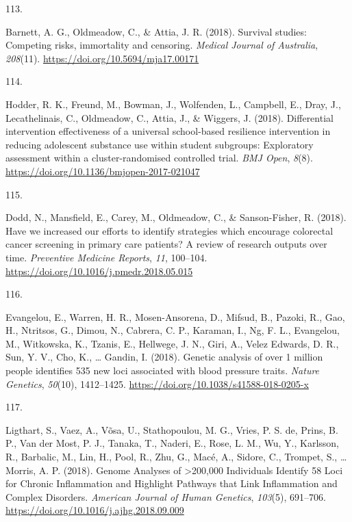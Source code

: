 \documentclass[11pt, a4paper]{awesome-cv}
\newlength{\csllabelwidth}
\newcommand{\CSLLeftMargin}[1]{\parbox[t]{\csllabelwidth}{#1}}
\newcommand{\CSLRightInline}[1]{\parbox[t]{\linewidth - \csllabelwidth}{#1}}
\begin{document}
\leavevmode\hypertarget{ref-barnett_survival_2018}{}%
\CSLLeftMargin{113. }
\CSLRightInline{Barnett, A. G., Oldmeadow, C., \& Attia, J. R. (2018).
Survival studies: Competing risks, immortality and censoring.
\emph{Medical Journal of Australia}, \emph{208}(11).
\url{https://doi.org/10.5694/mja17.00171}}

\leavevmode\hypertarget{ref-hodder_differential_2018}{}%
\CSLLeftMargin{114. }
\CSLRightInline{Hodder, R. K., Freund, M., Bowman, J., Wolfenden, L.,
Campbell, E., Dray, J., Lecathelinais, C., Oldmeadow, C., Attia, J., \&
Wiggers, J. (2018). Differential intervention effectiveness of a
universal school-based resilience intervention in reducing adolescent
substance use within student subgroups: Exploratory assessment within a
cluster-randomised controlled trial. \emph{BMJ Open}, \emph{8}(8).
\url{https://doi.org/10.1136/bmjopen-2017-021047}}

\leavevmode\hypertarget{ref-dodd_have_2018}{}%
\CSLLeftMargin{115. }
\CSLRightInline{Dodd, N., Mansfield, E., Carey, M., Oldmeadow, C., \&
Sanson-Fisher, R. (2018). Have we increased our efforts to identify
strategies which encourage colorectal cancer screening in primary care
patients? A review of research outputs over time. \emph{Preventive
Medicine Reports}, \emph{11}, 100--104.
\url{https://doi.org/10.1016/j.pmedr.2018.05.015}}

\leavevmode\hypertarget{ref-evangelou_genetic_2018}{}%
\CSLLeftMargin{116. }
\CSLRightInline{Evangelou, E., Warren, H. R., Mosen-Ansorena, D.,
Mifsud, B., Pazoki, R., Gao, H., Ntritsos, G., Dimou, N., Cabrera, C.
P., Karaman, I., Ng, F. L., Evangelou, M., Witkowska, K., Tzanis, E.,
Hellwege, J. N., Giri, A., Velez Edwards, D. R., Sun, Y. V., Cho, K.,
\ldots{} Gandin, I. (2018). Genetic analysis of over 1 million people
identifies 535 new loci associated with blood pressure traits.
\emph{Nature Genetics}, \emph{50}(10), 1412--1425.
\url{https://doi.org/10.1038/s41588-018-0205-x}}

\leavevmode\hypertarget{ref-ligthart_genome_2018}{}%
\CSLLeftMargin{117. }
\CSLRightInline{Ligthart, S., Vaez, A., Võsa, U., Stathopoulou, M. G.,
Vries, P. S. de, Prins, B. P., Van der Most, P. J., Tanaka, T., Naderi,
E., Rose, L. M., Wu, Y., Karlsson, R., Barbalic, M., Lin, H., Pool, R.,
Zhu, G., Macé, A., Sidore, C., Trompet, S., \ldots{} Morris, A. P.
(2018). Genome Analyses of \textgreater200,000 Individuals Identify 58
Loci for Chronic Inflammation and Highlight Pathways that Link
Inflammation and Complex Disorders. \emph{American Journal of Human
Genetics}, \emph{103}(5), 691--706.
\url{https://doi.org/10.1016/j.ajhg.2018.09.009}}
\end{document}
